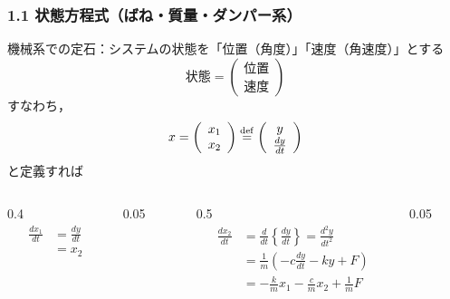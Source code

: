 \begin{frame}[t]
\frametitle{1.1 状態方程式（ばね・質量・ダンパー系）}
機械系での定石：システムの状態を「位置（角度）」「速度（角速度）」とする
\[
 \mbox{状態} =
 \left(\begin{array}{c}
         \mbox{位置}\\
   \mbox{速度}
       \end{array}\right)
\]
すなわち，
\begin{gather}
 x = \left(\begin{array}{c}
            x_1 \\
      x_2
     \end{array}\right)
 \stackrel{\rm def}{=}
 \left(\begin{array}{c}
         y \\
  \frac{dy}{dt}
       \end{array}\right)
\end{gather}
と定義すれば
\begin{columns}[t]
\begin{column}{0.4\textwidth}
\begin{align}
  \frac{dx_1}{dt} &= \frac{dy}{dt} \nonumber \\
                  &= x_2
\end{align}
\end{column}
\begin{column}{0.05\textwidth}

\end{column}
\begin{column}{0.5\textwidth}
\begin{align}
  \frac{dx_2}{dt} &= \frac{d}{dt} \left\{\frac{dy}{dt} \right\}
       = \frac{d^2 y}{dt^2} \nonumber \\
      &= \frac{1}{m} (-c \frac{dy}{dt} -k y + F) \nonumber \\
      &= -\frac{k}{m} x_1 - \frac{c}{m} x_2 + \frac{1}{m} F
\end{align}
\end{column}
\begin{column}{0.05\textwidth}

\end{column}
\end{columns}

\end{frame}

